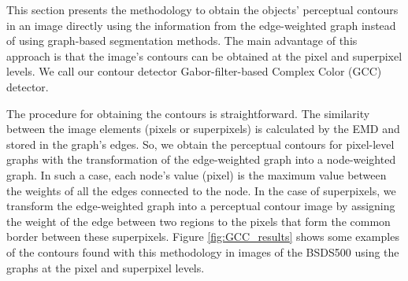 \documentclass[journal]{IEEEtran}
\begin{document}
This section presents the methodology to obtain the objects' perceptual contours in an image directly using the information from the edge-weighted graph instead of using graph-based segmentation methods. The main advantage of this approach is that the image's contours can be obtained at the pixel and superpixel levels. We call our contour detector Gabor-filter-based Complex Color (GCC) detector.

The procedure for obtaining the contours is straightforward. The similarity between the image elements (pixels or superpixels) is calculated by the EMD and stored in the graph's edges. So, we obtain the perceptual contours for pixel-level graphs with the transformation of the edge-weighted graph into a node-weighted graph. In such a case, each node's value (pixel) is the maximum value between the weights of all the edges connected to the node. In the case of superpixels, we transform the edge-weighted graph into a perceptual contour image by assigning the weight of the edge between two regions to the pixels that form the common border between these superpixels. Figure \ref{fig:GCC_results} shows some examples of the contours found with this methodology in images of the BSDS500 using the graphs at the pixel and superpixel levels. 
\end{document}

